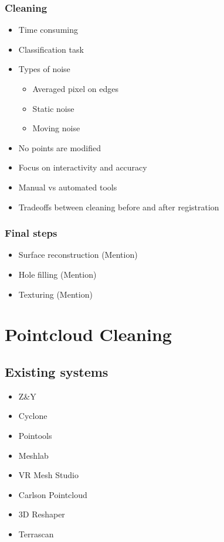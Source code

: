 		\subsubsection{Cleaning}
			\begin{itemize}
			\item Time consuming
			\item Classification task
			\item Types of noise
				\begin{itemize}
				\item Averaged pixel on edges
				\item Static noise
				\item Moving noise
				\end{itemize}
			\item No points are modified
			\item Focus on interactivity and accuracy
			\item Manual vs automated tools
			\item Tradeoffs between cleaning before and after registration
			\end{itemize}

		\subsubsection{Final steps}
			\begin{itemize}
			\item Surface reconstruction (Mention)
			\item Hole filling (Mention)
			\item Texturing (Mention)
			\end{itemize}


\section{Pointcloud Cleaning}
	\subsection{Existing systems}
		\begin{itemize}
		\item Z\&Y
		\item Cyclone
		\item Pointools
		\item Meshlab
		\item VR Mesh Studio
		\item Carlson Pointcloud
		\item 3D Reshaper
		\item Terrascan
		\end{itemize}

